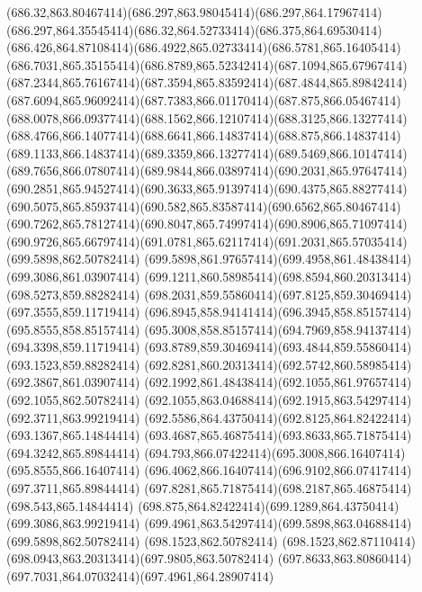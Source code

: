 {{	\curveto(686.32,863.80467414)(686.297,863.98045414)(686.297,864.17967414)
	\curveto(686.297,864.35545414)(686.32,864.52733414)(686.375,864.69530414)
	\curveto(686.426,864.87108414)(686.4922,865.02733414)(686.5781,865.16405414)
	\curveto(686.7031,865.35155414)(686.8789,865.52342414)(687.1094,865.67967414)
	\curveto(687.2344,865.76167414)(687.3594,865.83592414)(687.4844,865.89842414)
	\curveto(687.6094,865.96092414)(687.7383,866.01170414)(687.875,866.05467414)
	\curveto(688.0078,866.09377414)(688.1562,866.12107414)(688.3125,866.13277414)
	\curveto(688.4766,866.14077414)(688.6641,866.14837414)(688.875,866.14837414)
	\curveto(689.1133,866.14837414)(689.3359,866.13277414)(689.5469,866.10147414)
	\curveto(689.7656,866.07807414)(689.9844,866.03897414)(690.2031,865.97647414)
	\curveto(690.2851,865.94527414)(690.3633,865.91397414)(690.4375,865.88277414)
	\curveto(690.5075,865.85937414)(690.582,865.83587414)(690.6562,865.80467414)
	\curveto(690.7262,865.78127414)(690.8047,865.74997414)(690.8906,865.71097414)
	\curveto(690.9726,865.66797414)(691.0781,865.62117414)(691.2031,865.57035414)
	\closepath
	\moveto(699.5898,862.50782414)
	\curveto(699.5898,861.97657414)(699.4958,861.48438414)(699.3086,861.03907414)
	\curveto(699.1211,860.58985414)(698.8594,860.20313414)(698.5273,859.88282414)
	\curveto(698.2031,859.55860414)(697.8125,859.30469414)(697.3555,859.11719414)
	\curveto(696.8945,858.94141414)(696.3945,858.85157414)(695.8555,858.85157414)
	\curveto(695.3008,858.85157414)(694.7969,858.94137414)(694.3398,859.11719414)
	\curveto(693.8789,859.30469414)(693.4844,859.55860414)(693.1523,859.88282414)
	\curveto(692.8281,860.20313414)(692.5742,860.58985414)(692.3867,861.03907414)
	\curveto(692.1992,861.48438414)(692.1055,861.97657414)(692.1055,862.50782414)
	\curveto(692.1055,863.04688414)(692.1915,863.54297414)(692.3711,863.99219414)
	\curveto(692.5586,864.43750414)(692.8125,864.82422414)(693.1367,865.14844414)
	\curveto(693.4687,865.46875414)(693.8633,865.71875414)(694.3242,865.89844414)
	\curveto(694.793,866.07422414)(695.3008,866.16407414)(695.8555,866.16407414)
	\curveto(696.4062,866.16407414)(696.9102,866.07417414)(697.3711,865.89844414)
	\curveto(697.8281,865.71875414)(698.2187,865.46875414)(698.543,865.14844414)
	\curveto(698.875,864.82422414)(699.1289,864.43750414)(699.3086,863.99219414)
	\curveto(699.4961,863.54297414)(699.5898,863.04688414)(699.5898,862.50782414)
	\closepath
	\moveto(698.1523,862.50782414)
	\curveto(698.1523,862.87110414)(698.0943,863.20313414)(697.9805,863.50782414)
	\curveto(697.8633,863.80860414)(697.7031,864.07032414)(697.4961,864.28907414)
}}
